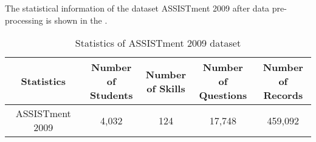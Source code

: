 The statistical information of the dataset ASSISTment 2009 after data pre-processing is shown in the \tblname{\ref{tbl:ch3-assist2009-stat}}.
\begin{table}
    \centering
    \caption{Statistics of ASSISTment 2009 dataset}\label{tbl:ch3-assist2009-stat}
    \begin{tabular}{ccccc}
        \toprule
        Statistics      & \makecell[c]{Number                          \\ of Students} & \makecell[c]{Number                         \\of Skills }& \makecell[c]{Number                         \\of Questions }& \makecell[c]{Number                         \\ of Records} \\
        \midrule
        ASSISTment 2009 & 4,032               & 124 & 17,748 & 459,092 \\
        \bottomrule
    \end{tabular}
\end{table}

